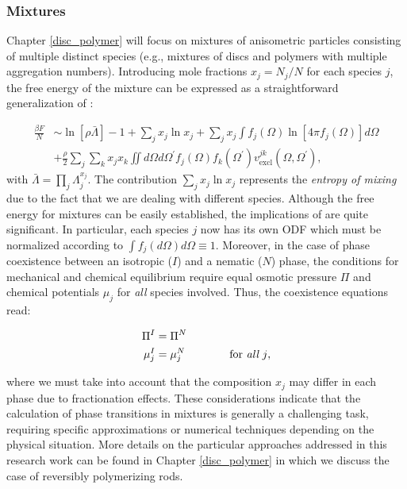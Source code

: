 \subsubsection{Mixtures}

Chapter \ref{disc_polymer} will focus on mixtures of anisometric particles consisting of multiple distinct species (e.g., mixtures of discs and polymers with multiple aggregation numbers). Introducing mole fractions $x_{j}=N_{j}/N$ for each species $j$, the free energy of the mixture can be expressed as a straightforward generalization of :

\begin{align}
\frac{\beta F}{N} &\sim \ln [\rho \bar{\Lambda}]-1 + \sum_{j} x_{j} \ln x_{j} +
\sum_{j} x_{j} \int f_{j}(\Omega)\ln \left[ 4 \pi f_{j}(\Omega) \right] d \Omega \nonumber \\
&+\frac{\rho}{2}\sum_{j}\sum_{k}x_{j}x_{k} \iint  d \Omega d\Omega^{\prime}
f_{j}(\Omega)f_{k}(\Omega^{\prime})
v_{\text{excl}}^{jk}(\Omega,\Omega^{\prime}),  \label{0freetotmulti}
\end{align}
with $\bar{\Lambda}=\prod_{j}\Lambda_{j}^{x_{j}}$. The contribution $\sum_{j} x_{j} \ln x_{j}$ represents the {\em entropy of mixing} due to the fact that we are dealing with different species. Although the free energy for mixtures can be easily established,  the implications of  are quite significant. In particular, each species $j$ now has its own ODF which must be normalized according to $\int f_{j}(d\Omega)d\Omega \equiv 1$. Moreover, in the case of phase coexistence between an isotropic ($I$) and a nematic ($N$) phase, the conditions for mechanical and chemical equilibrium require equal osmotic pressure $\Pi$ and chemical potentials $\mu_{j}$ for {\em all} species involved. Thus, the coexistence equations read:

\begin{align}
\Pi^{I}&=\Pi^{N} \nonumber \\
\mu^{I}_{j}&=\mu^{N}_{j} \qquad\qquad \text{for {\em all} $j$},
\end{align}

where we must take into account that the composition ${x_{j}}$ may differ in each phase due to fractionation effects. These considerations indicate that the calculation of phase transitions in mixtures is generally a challenging task, requiring specific approximations or numerical techniques depending on the physical situation. More details on the particular approaches addressed in this research work can be found in Chapter \ref{disc_polymer} in which we discuss the case of reversibly polymerizing rods.


